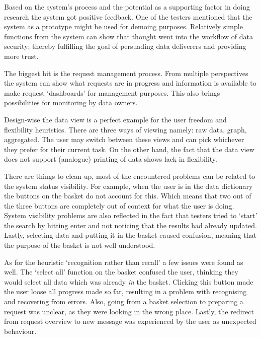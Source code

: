 \noindent{} Based on the system's process and the potential as a supporting factor in doing research the system got positive feedback.
One of the testers mentioned that the system as a prototype might be used for demoing purposes. 
Relatively simple functions from the system can show that thought went into the workflow of data security;
thereby fulfilling the goal of persuading data deliverers and providing more trust.

The biggest hit is the request management process.
From multiple perspectives the system can show what requests are in progress and information is available to make request `dashboards' for management purposes.
This also brings possibilities for monitoring by data owners.

Design-wise the data view is a perfect example for the user freedom and flexibility heuristics.
There are three ways of viewing namely: raw data, graph, aggregated.
The user may switch between these views and can pick whichever they prefer for their current task.
On the other hand, the fact that the data view does not support (analogue) printing of data shows lack in flexibility.

There are things to clean up, most of the encountered problems can be related to the system status visibility.
For example, when the user is in the data dictionary the buttons on the basket do not account for this.
Which means that two out of the three buttons are completely out of context for what the user is doing.
System visibility problems are also reflected in the fact that testers tried to `start' the search by hitting enter and not noticing that the results had already updated.
Lastly, selecting data and putting it in the basket caused confusion, meaning that the purpose of the basket is not well understood.

As for the heuristic `recognition rather than recall' a few issues were found as well.
The `select all' function on the basket confused the user, thinking they would select all data which was already \emph{in} the basket.
Clicking this button made the user loose all progress made so far, resulting in a problem with recognising and recovering from errors.
Also, going from a basket selection to preparing a request was unclear, as they were looking in the wrong place.
Lastly, the redirect from request overview to new message was experienced by the user as unexpected behaviour.